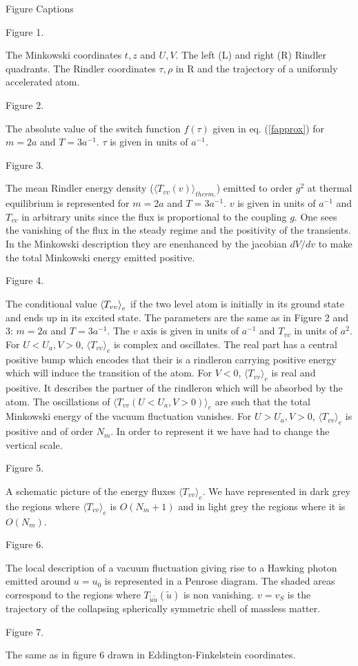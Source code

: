\documentclass[12pt]{article}
\begin{document}
\vfill \newpage

Figure Captions

Figure 1.

\noindent The Minkowski coordinates $t,z$ and $U,V$. The
left (L) and right (R) Rindler quadrants. The Rindler coordinates $\tau ,
\rho$ in R and the trajectory of a uniformly accelerated atom.

Figure 2.

\noindent The absolute value of the switch function $f(\tau)$ given in eq.
(\ref{fapprox}) for $m=2a$ and $T=3 a^{-1}$. $\tau$ is given in units of
$a^{-1}$.

Figure 3.

\noindent The mean Rindler energy density ($\langle
T_{vv}(v)\rangle_{therm.}$) emitted to order $g^2$ at thermal equilibrium
 is represented
for  $m=2a$ and $T=3a^{-1}$. $v$ is given in units of $a^{-1}$ and $T_{vv}$ in
arbitrary units since the flux is proportional to the coupling $g$.
One sees the vanishing of the flux in the steady regime and the positivity
of the transients.
In the Minkowski description they are enenhanced by the jacobian $dV/dv$ to
make the total
Minkowski energy emitted positive.

Figure 4.

\noindent The conditional value $\mbox{$ \langle T_{vv} \rangle $}_e$ if the two level
atom is initially in its ground state and ends up in its excited state. The
parameters are the same as in Figure 2 and 3: $m=2a$ and $T = 3 a^{-1}$. The
$v$ axis is given in units of $a^{-1}$ and $T_{vv}$ in units of $a^2$.
For  $U<U_a, V>0$, $\langle T_{vv} \rangle _e$ is complex and oscillates. The
real part has a central positive bump which encodes that their is a
rindleron carrying positive energy which will induce the transition of the
atom. For $V<0$, $\langle T_{vv} \rangle _e$
is real and positive. It describes the partner of the rindleron which will
be absorbed by the atom. The oscillations of $\langle T_{vv}
(U<U_a, V>0) \rangle _e$ are such that the total Minkowski energy of the
vacuum fluctuation vanishes. For $U>U_a, V>0$, $\langle T_{vv} \rangle _e$
is positive and of order $N_m$. In order to represent it we have had to
change the vertical scale.

Figure 5.

\noindent A schematic picture of the energy fluxes $\langle T_{vv} \rangle
_e$. We have represented in dark grey the regions where
$\langle T_{vv} \rangle_e$ is $O(N_m+1)$ and in light grey the regions
where it is $O(N_m)$.

Figure 6.

\noindent The local description of a vacuum fluctuation
giving rise to a Hawking photon emitted around $u=u_0$ is
represented in a Penrose diagram. The shaded areas
correspond to the regions where
$T_{\tilde u \tilde u}(\tilde u)$ is non vanishing.
$v=v_S$ is the trajectory of the collapsing spherically
symmetric shell of massless matter.

Figure 7.

\noindent The same as in figure 6 drawn in
Eddington-Finkelstein coordinates.
\end{document}
